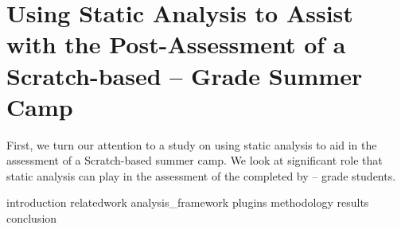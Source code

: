 \chapter{Using Static Analysis to Assist with the Post-Assessment of a
  Scratch-based -- Grade Summer Camp}
\label{chap:hairball}

\def\currentprefix{hairball}

First, we turn our attention to a study on using static analysis to aid in the
assessment of a Scratch-based summer camp. We look at significant role that
static analysis can play in the assessment of the  completed by
-- grade students.

{introduction}
{relatedwork}
{analysis_framework}
{plugins}
{methodology}
{results}
{conclusion}
